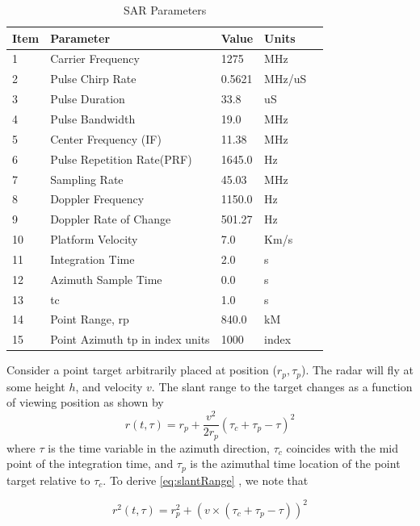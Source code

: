\begin{table}[]
\centering
\caption{SAR Parameters}
\label{my-label}
\begin{tabular}{@{}lllll@{}}
\toprule
Item & Parameter         & Value  & Units  &  \\ \midrule
1    & Carrier Frequency & 1275   & MHz    &  \\
2    & Pulse Chirp Rate  & 0.5621 & MHz/uS &  \\
3    & Pulse Duration    & 33.8   & uS     &  \\
4	&Pulse Bandwidth 	&19.0	&MHz 	& \\
5	&Center Frequency (IF) 	&11.38	&MHz & \\
6   &Pulse Repetition Rate(PRF)   &1645.0	&Hz   & \\
7   &Sampling Rate &45.03	&MHz	& \\
8   &Doppler Frequency  &1150.0	   &Hz &   \\
9   &Doppler Rate of Change   &501.27    &Hz  & \\
10  &Platform Velocity   &7.0	&Km/s & \\
11  &Integration Time &2.0   &s   & \\
12  &Azimuth Sample Time &0.0	&s & \\
13 &tc	& 1.0	&s & \\
14 &Point Range, rp	&840.0  &kM &\\
15  &Point Azimuth tp in index units &1000 &index &\\


\end{tabular}
\end{table}
Consider a point target arbitrarily placed at position  ($r_{p},\tau_{p}$). The radar will fly at some height $h$, and velocity $v$. The slant range to the target changes as a function of viewing position as shown by
\begin{equation}
\label{eq:slantRange}
r(t,\tau) = r_p+\frac{v^2}{2r_p}(\tau_c+\tau_p-\tau)^2
\end{equation}
where $\tau$ is the time variable in the azimuth direction, $\tau_c$ coincides with the mid point of the integration time, and $\tau_p$ is the azimuthal time location of the point target relative to $\tau_c$. 
To derive \ref{eq:slantRange} , we note that 

\begin{equation}
\label{eq:slantRange2}
r^2(t,\tau) = r_p^2+\left (v\times(\tau_c+\tau_p-\tau)\right )^2
\end{equation}

